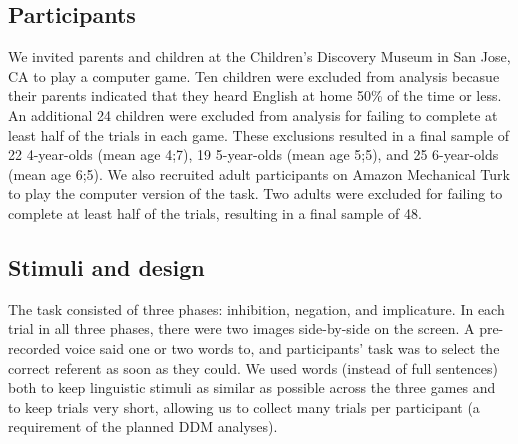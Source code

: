 \documentclass[10pt,letterpaper]{article}
\newcommand{\aen}[1]{\textcolor{DarkOrange}{[aen: #1]}}
\begin{document}

\subsection{Participants}

We invited parents and children at the Children's Discovery Museum in San Jose, CA to play a computer game. Ten children were excluded from analysis becasue their parents indicated that they heard English at home 50\% of the time or less. An additional 24 children were excluded from analysis for failing to complete at least half of the trials in each game. These exclusions resulted in a final sample of 22 4-year-olds (mean age 4;7), 19 5-year-olds (mean age 5;5), and 25 6-year-olds (mean age 6;5). We also recruited adult participants on Amazon Mechanical Turk to play the computer version of the task. Two adults were excluded for failing to complete at least half of the trials, resulting in a final sample of 48.

\subsection{Stimuli and design}

The task consisted of three phases: inhibition, negation, and implicature. In each trial in all three phases, there were two images side-by-side on the screen. A pre-recorded voice said one or two words to, and participants' task was to select the correct referent as soon as they could. We used words (instead of full sentences) both to keep linguistic stimuli as similar as possible across the three games and to keep trials very short, allowing us to collect many trials per participant (a requirement of the planned DDM analyses).
\end{document}
